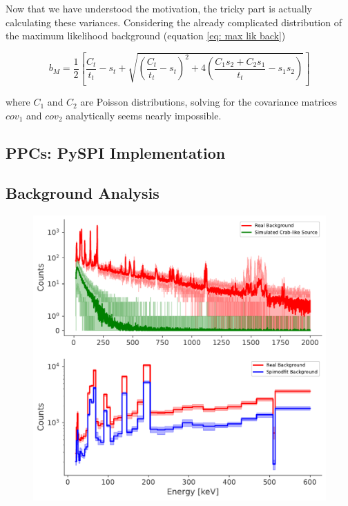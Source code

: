 \documentclass{report}
\begin{document}
Now that we have understood the motivation, the tricky part is actually calculating these variances. Considering the already complicated distribution of the maximum likelihood background (equation \ref{eq: max lik back})

\begin{equation*}
  b_M = \frac{1}{2} \left[ \frac{C_t}{t_t} - s_t + \sqrt{\left( \frac{C_t}{t_t} - s_t\right)^2 + 4 \left( \frac{C_1s_2+C_2s_1}{t_t}-s_1s_2\right)}\right]
\end{equation*}

where $C_1$ and $C_2$ are Poisson distributions, solving for the covariance matrices $cov_1$ and $cov_2$ analytically seems nearly impossible.


\subsection{PPCs: PySPI Implementation}

\subsection{Background Analysis}

\begin{figure}[h]
  \centering
  \includegraphics[width=\textwidth]{Images/PPC_and_Background_Analysis/background_spectrum.pdf}
  \caption{}
  \label{fig back spec}
\end{figure}
\end{document}
